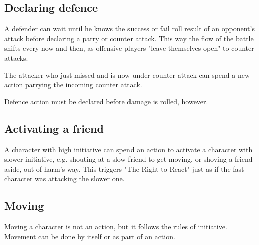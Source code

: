 

\subsection*{Declaring defence}
A defender can wait until he knows the success or fail roll result of an opponent's attack before declaring a parry or counter attack. This way the flow of the battle shifts every now and then, as offensive players "leave themselves open" to counter attacks.

The attacker who just missed and is now under counter attack can spend a new action parrying the incoming counter attack.

Defence action must be declared before damage is rolled, however.


\subsection*{Activating a friend}
A character with high initiative can spend an action to activate a character with slower initiative, e.g. shouting at a slow friend to get moving, or shoving a friend aside, out of harm's way. This triggers "The Right to React" just as if the fast character was attacking the slower one.






















\subsection*{Moving}
Moving a character is not an action, but it follows the rules of initiative. Movement can be done by itself or as part of an action.

